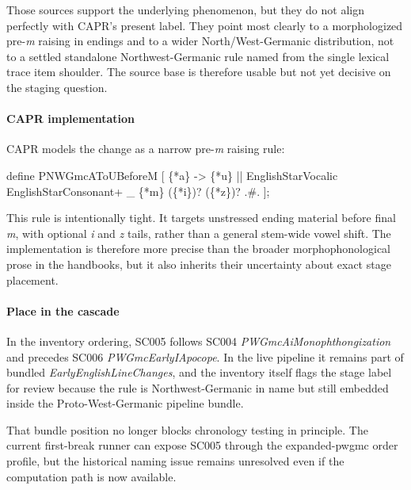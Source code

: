 \documentclass[
  british,
  a4paper,
]{article}
\newenvironment{Shaded}{}{}
\newcommand{\NormalTok}[1]{#1}
\begin{document}
Those sources support the underlying phenomenon, but they do not align
perfectly with CAPR's present label. They point most clearly to a
morphologized pre-\emph{m} raising in endings and to a wider
North/West-Germanic distribution, not to a settled standalone
Northwest-Germanic rule named from the single lexical trace item
shoulder. The source base is therefore usable but not yet decisive on
the staging question.

\paragraph{CAPR implementation}\label{capr-implementation-2}

CAPR models the change as a narrow pre-\emph{m} raising rule:

\begin{Shaded}
\begin{Highlighting}[]
\NormalTok{define PNWGmcAToUBeforeM [}
\NormalTok{    \{*a\} {-}\textgreater{} \{*u\} || EnglishStarVocalic EnglishStarConsonant+ \_ \{*m\} (\{*i\})? (\{*z\})? .\#.}
\NormalTok{];}
\end{Highlighting}
\end{Shaded}

This rule is intentionally tight. It targets unstressed ending material
before final \emph{m}, with optional \emph{i} and \emph{z} tails, rather
than a general stem-wide vowel shift. The implementation is therefore
more precise than the broader morphophonological prose in the handbooks,
but it also inherits their uncertainty about exact stage placement.

\paragraph{Place in the cascade}\label{place-in-the-cascade-2}

In the inventory ordering, SC005 follows SC004
\emph{PWGmcAiMonophthongization} and precedes SC006
\emph{PWGmcEarlyIApocope}. In the live pipeline it remains part of
bundled \emph{EarlyEnglishLineChanges}, and the inventory itself flags
the stage label for review because the rule is Northwest-Germanic in
name but still embedded inside the Proto-West-Germanic pipeline bundle.

That bundle position no longer blocks chronology testing in principle.
The current first-break runner can expose SC005 through the
expanded-pwgmc order profile, but the historical naming issue remains
unresolved even if the computation path is now available.
\end{document}
